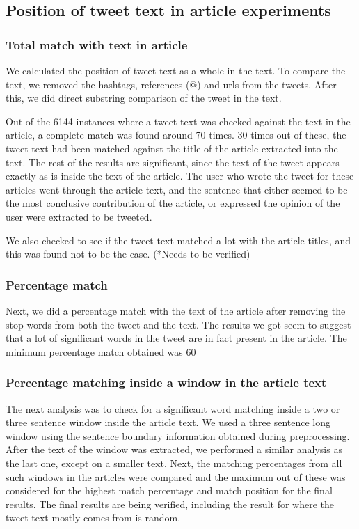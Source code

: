 \documentclass[11pt]{article}
\begin{document}
\subsection{Position of tweet text in article experiments}
\subsubsection {Total match with text in article}

We calculated the position of tweet text as a whole in the text. To compare the text, we removed the hashtags, references (@) and urls from the tweets. After this, we did direct substring comparison of the tweet in the text. 

Out of the 6144 instances where a tweet text was checked against the text in the article, a complete match was found around 70 times. 30 times out of these, the tweet text had been matched against the title of the article extracted into the text. The rest of the results are significant, since the text of the tweet appears exactly as is inside the text of the article. The user who wrote the tweet for these articles went through the article text, and the sentence that either seemed to be the most conclusive contribution of the article, or expressed the opinion of the user were extracted to be tweeted. 

We also checked to see if the tweet text matched a lot with the article titles, and this was found not to be the case. (*Needs to be verified)

\subsubsection{Percentage match}

Next, we did a percentage match with the text of the article after removing the stop words from both the tweet and the text. The results we got seem to suggest that a lot of significant words in the tweet are in fact present in the article. The minimum percentage match obtained was 60%

\subsubsection{Percentage matching inside a window in the article text}

The next analysis was to check for a significant word matching inside a two or three sentence window inside the article text. We used a three sentence long window using the sentence boundary information obtained during preprocessing. After the text of the window was extracted, we performed a similar analysis as the last one, except on a smaller text. Next, the matching percentages from all such windows in the articles were compared and the maximum out of these was considered for the highest match percentage and match position for the final results. The final results are being verified, including the result for where the tweet text mostly comes from is random.
\end{document}
